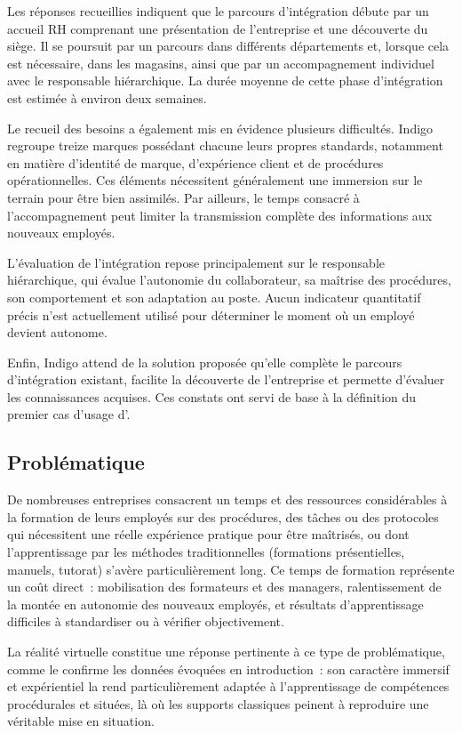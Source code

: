 Les réponses recueillies indiquent que le parcours d'intégration débute par un accueil
RH comprenant une présentation de l'entreprise et une découverte du siège. Il se
poursuit par un parcours dans différents départements et, lorsque cela est nécessaire,
dans les magasins, ainsi que par un accompagnement individuel avec le responsable
hiérarchique. La durée moyenne de cette phase d'intégration est estimée à environ
deux semaines.

Le recueil des besoins a également mis en évidence plusieurs difficultés. Indigo
regroupe treize marques possédant chacune leurs propres standards, notamment en
matière d'identité de marque, d'expérience client et de procédures opérationnelles.
Ces éléments nécessitent généralement une immersion sur le terrain pour être bien
assimilés. Par ailleurs, le temps consacré à l'accompagnement peut limiter la
transmission complète des informations aux nouveaux employés.

L'évaluation de l'intégration repose principalement sur le responsable hiérarchique,
qui évalue l'autonomie du collaborateur, sa maîtrise des procédures, son comportement
et son adaptation au poste. Aucun indicateur quantitatif précis n'est actuellement
utilisé pour déterminer le moment où un employé devient autonome.

Enfin, Indigo attend de la solution proposée qu'elle complète le parcours
d'intégration existant, facilite la découverte de l'entreprise et permette d'évaluer
les connaissances acquises. Ces constats ont servi de base à la définition du premier
cas d'usage d'\tynassit{}.

\subsection{Problématique}

De nombreuses entreprises consacrent un temps et des ressources considérables à la
formation de leurs employés sur des procédures, des tâches ou des protocoles qui
nécessitent une réelle expérience pratique pour être maîtrisés, ou dont l'apprentissage
par les méthodes traditionnelles (formations présentielles, manuels, tutorat) s'avère
particulièrement long. Ce temps de formation représente un coût direct~: mobilisation
des formateurs et des managers, ralentissement de la montée en autonomie des nouveaux
employés, et résultats d'apprentissage difficiles à standardiser ou à vérifier
objectivement.

La réalité virtuelle constitue une réponse pertinente à ce type de problématique,
comme le confirme les données évoquées en introduction~: son caractère immersif et
expérientiel la rend particulièrement adaptée à l'apprentissage de compétences
procédurales et situées, là où les supports classiques peinent à reproduire une
véritable mise en situation.

